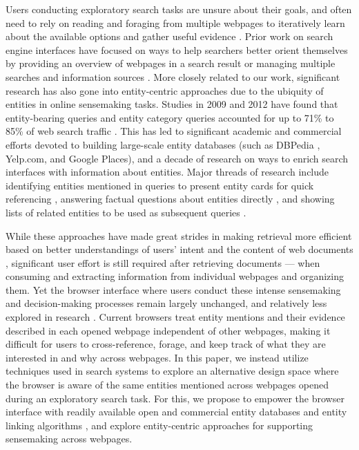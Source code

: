Users conducting exploratory search tasks are unsure about their goals, and often need to rely on reading and foraging from multiple webpages to iteratively learn about the available options and gather useful evidence \cite{mar2006exp}. Prior work on search engine interfaces have focused on ways to help searchers better orient themselves by providing an overview of webpages in a search result \cite{marchionini2000agileviews,patterson2001predicting,tretter2013searchpanel} or managing multiple searches and information sources \cite{morris2008searchbar,hahn2018bento}. More closely related to our work, significant research has also gone into entity-centric approaches due to the ubiquity of entities in online sensemaking tasks. Studies in 2009 and 2012 have found that entity-bearing queries and entity category queries accounted for up to 71\% to 85\% of web search traffic \cite{guo2009named,lin2012active}. This has led to significant academic and commercial efforts devoted to building large-scale entity databases (such as DBPedia \cite{dbpedia}, Yelp.com, and Google Places), and a decade of research on ways to enrich search interfaces with information about entities. Major threads of research include identifying entities mentioned in queries to present entity cards for quick referencing \cite{bota,miliaraki2015selena}, answering factual questions about entities directly \cite{D15-1038}, and showing lists of related entities to be used as subsequent queries \cite{blanco2013entity, bordino2013penguins,klouche2015designing}. 

While these approaches have made great strides in making retrieval more efficient based on better understandings of users' intent \cite{miliaraki2015selena} and the content of web documents \cite{fernandez2008semantic}, significant user effort is still required after retrieving documents --- when consuming and extracting information from individual webpages and organizing them. Yet the browser interface where users conduct these intense sensemaking and decision-making processes remain largely unchanged, and relatively less explored in research \cite{whatwentwrong}. Current browsers treat entity mentions and their evidence described in each opened webpage independent of other webpages, making it difficult for users to cross-reference, forage, and keep track of what they are interested in and why across webpages. In this paper, we instead utilize techniques used in search systems to explore an alternative design space where the browser is aware of the same entities mentioned across webpages opened during an exploratory search task. For this, we propose to empower the browser interface with readily available open and commercial entity databases \cite{dbpedia} and entity linking algorithms \cite{spotlight}, and explore entity-centric approaches for supporting sensemaking across webpages.


